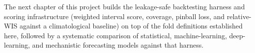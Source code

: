 \documentclass[11pt]{report}
\begin{document}
The next chapter of this project builds the leakage-safe backtesting harness and scoring infrastructure (weighted interval score, coverage, pinball loss, and relative-WIS against a climatological baseline) on top of the fold definitions established here, followed by a systematic comparison of statistical, machine-learning, deep-learning, and mechanistic forecasting models against that harness.
\end{document}
